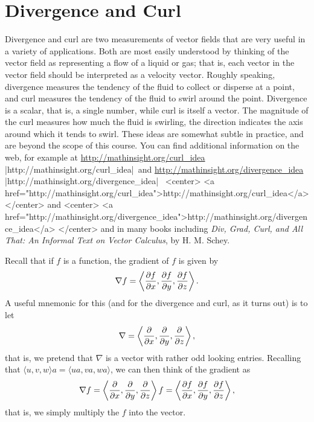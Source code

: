 \section{Divergence and Curl}{}{}

Divergence and curl are two measurements of vector fields that are
very useful in a variety of applications. Both are most easily
understood by thinking of the vector field as representing a flow of a
liquid or gas;
that is, each vector in the vector field should be interpreted as a
velocity vector. 
Roughly speaking, divergence
measures the tendency of 
the fluid to collect or disperse at a point, and curl measures the
tendency of the fluid to swirl around the point. Divergence is a
scalar, that is, a single number, while curl is itself a vector. The
magnitude of the curl measures how much the fluid is swirling, the
direction indicates the axis around which it tends to swirl. These
ideas are somewhat subtle in practice, and are beyond the scope of
this course. You can find additional information on the web, for
example at 
\texonly
\url{http://mathinsight.org/curl_idea}%
\vb|http://mathinsight.org/curl_idea|\endurl\ 
and 
\url{http://mathinsight.org/divergence_idea}%
\vb|http://mathinsight.org/divergence_idea|\endurl\ 
\endtexonly
\htmlonly
<center>
<a href="http://mathinsight.org/curl_idea">http://mathinsight.org/curl_idea</a>
</center>
and
<center>
<a href="http://mathinsight.org/divergence_idea">http://mathinsight.org/divergence_idea</a>
</center>
\endhtmlonly
and in
many books including {\em
Div, Grad, Curl, and All That: An Informal Text on Vector Calculus},
by H. M. Schey.

Recall that if $f$ is a function, the gradient of $f$
is given by 
$$\nabla f=\left\langle {\partial f\over\partial x},{\partial
  f\over\partial y},{\partial f\over\partial z}\right\rangle.$$
A useful mnemonic for this (and for the divergence and curl, as it
turns out) is to let
$$\nabla = \left\langle{\partial \over\partial x},{\partial
  \over\partial y},{\partial \over\partial z}\right\rangle,$$
that is, we pretend that $\nabla$ is a vector with rather odd looking
entries. Recalling that $\langle u,v,w\rangle a=\langle ua,va,wa\rangle$,
we can then think of the gradient as
$$\nabla f=\left\langle{\partial \over\partial x},{\partial
  \over\partial y},{\partial \over\partial z}\right\rangle f = 
\left\langle {\partial f\over\partial x},{\partial
  f\over\partial y},{\partial f\over\partial z}\right\rangle,$$
that is, we simply multiply the $f$ into the vector.

